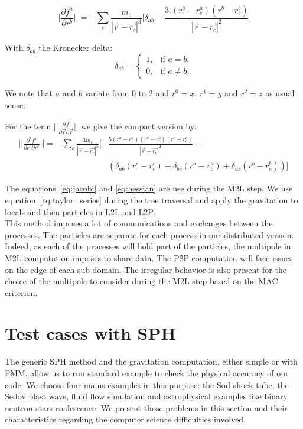 \begin{equation}
 ||\frac{\partial f^a}{\partial r^b}|| = -\sum_c \frac{m_c}{|\vec{r}-\vec{r_c}|^3} \Big[ \delta_{ab} - \frac{3.(r^a-r_c^a)(r^b-r_c^b)}{|\vec{r}-\vec{r_c}|^2} \Big] 
 \label{eq:jacobi}
\end{equation}

With $\delta_{ab}$ the Kronecker delta:
\begin{equation}
\delta_{ab} = 
\begin{cases}
    1, & \text{if $a = b$}.\\
    0, & \text{if $a\neq b$}.
  \end{cases}
\end{equation}

We note that $a$ and $b$ variate from 0 to 2 and $r^0=x$, $r^1=y$ and $r^2=z$ as usual sense. 

For the term $||\frac{\partial\vec{f}}{\partial\vec{r} \partial\vec{r}}||$ we give the compact version by:
\begin{equation}
\begin{aligned}
||\frac{\partial^2 f^a}{\partial r^b \partial r^c}|| = - \sum_c \frac{3 m_c}{|\vec{r}-\vec{r_c}|^5} \Big[ & \frac{5(r^a-r_c^a)(r^b-r_c^b)(r^c-r_c^c)}{|\vec{r}-\vec{r_c}|^2} - \\ 
		 & \left( \delta_{ab} (r^c-r_c^c)+\delta_{bc} (r^a-r_c^a)+\delta_{ac} (r^b-r_c^b) \right) \Big] 
\end{aligned}
\label{eq:hessian}
\end{equation} 

The equations~\ref{eq:jacobi} and \ref{eq:hessian} are use during the M2L step. 
We use equation~\ref{eq:taylor_series} during the tree traversal and apply the gravitation to locals and then particles in L2L and L2P.\\

This method imposes a lot of communications and exchanges between the processes. 
The particles are separate for each process in our distributed version.
Indeed, as each of the processes will hold part of the particles, the multipole in M2L computation imposes to share data. 
The P2P computation will face issues on the edge of each sub-domain. 
The irregular behavior is also present for the choice of the multipole to consider during the M2L step based on the MAC criterion.

\section{Test cases with SPH} 
\label{sec:applications}
The generic SPH method and the gravitation computation, either simple or with FMM, allow us to run standard example to check the physical accuracy of our code. 
We choose four mains examples in this purpose: the Sod shock tube, the Sedov blast wave, fluid flow simulation and astrophysical examples like binary neutron stars coalescence.
We present those problems in this section and their characteristics regarding the computer science difficulties involved. 

